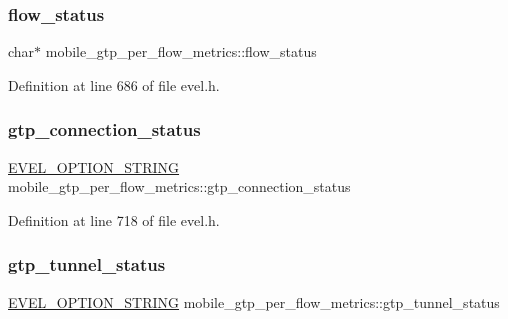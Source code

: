 \hypertarget{structmobile__gtp__per__flow__metrics_a4be001fad7fe7eae7b502b52198153b0}{}\label{structmobile__gtp__per__flow__metrics_a4be001fad7fe7eae7b502b52198153b0} 
\subsubsection{\texorpdfstring{flow\+\_\+status}{flow\_status}}
{\footnotesize\ttfamily char$\ast$ mobile\+\_\+gtp\+\_\+per\+\_\+flow\+\_\+metrics\+::flow\+\_\+status}



Definition at line 686 of file evel.\+h.

\hypertarget{structmobile__gtp__per__flow__metrics_a89fdf6278e4c7838d40f523a82b7ca23}{}\label{structmobile__gtp__per__flow__metrics_a89fdf6278e4c7838d40f523a82b7ca23} 
\subsubsection{\texorpdfstring{gtp\+\_\+connection\+\_\+status}{gtp\_connection\_status}}
{\footnotesize\ttfamily \hyperlink{evel_8h_a0de5113a7b72de93c0c7b644f7ea7ec3}{E\+V\+E\+L\+\_\+\+O\+P\+T\+I\+O\+N\+\_\+\+S\+T\+R\+I\+NG} mobile\+\_\+gtp\+\_\+per\+\_\+flow\+\_\+metrics\+::gtp\+\_\+connection\+\_\+status}



Definition at line 718 of file evel.\+h.

\hypertarget{structmobile__gtp__per__flow__metrics_ac056f28d4a00c59e101c51225aaecb64}{}\label{structmobile__gtp__per__flow__metrics_ac056f28d4a00c59e101c51225aaecb64} 
\subsubsection{\texorpdfstring{gtp\+\_\+tunnel\+\_\+status}{gtp\_tunnel\_status}}
{\footnotesize\ttfamily \hyperlink{evel_8h_a0de5113a7b72de93c0c7b644f7ea7ec3}{E\+V\+E\+L\+\_\+\+O\+P\+T\+I\+O\+N\+\_\+\+S\+T\+R\+I\+NG} mobile\+\_\+gtp\+\_\+per\+\_\+flow\+\_\+metrics\+::gtp\+\_\+tunnel\+\_\+status}



